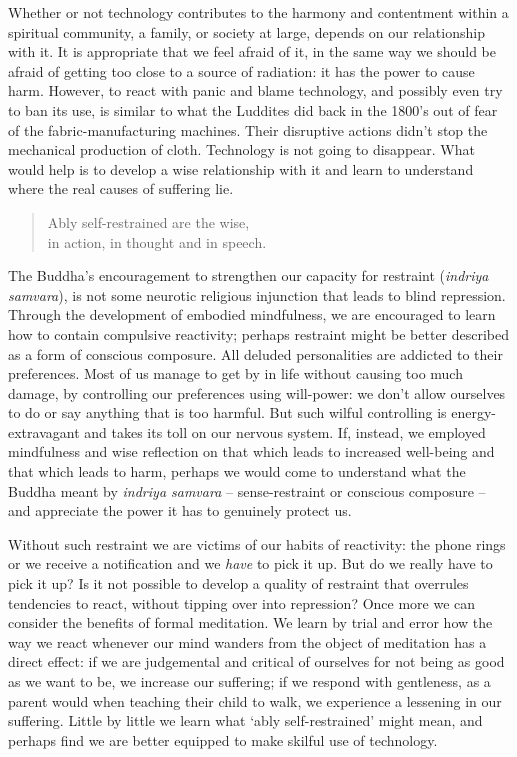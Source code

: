 Whether or not technology contributes to the harmony and contentment
within a spiritual community, a family, or society at large, depends on
our relationship with it. It is appropriate that we feel afraid of it,
in the same way we should be afraid of getting too close to a source of
radiation: it has the power to cause harm. However, to react with panic
and blame technology, and possibly even try to ban its use, is
similar to what the Luddites\cite{luddites}
did back in the 1800's out of fear of the fabric-manufacturing
machines. Their disruptive actions didn't stop the mechanical production
of cloth. Technology is not going to disappear. What would help is to
develop a wise relationship with it and learn to understand where the
real causes of suffering lie.

\begin{quote}
  Ably self-restrained are the wise,\\
  in action, in thought and in speech.

\end{quote}

The Buddha's encouragement to strengthen our capacity for restraint
(\emph{indriya samvara}), is not some neurotic religious injunction that
leads to blind repression. Through the development of embodied
mindfulness, we are encouraged to learn how to contain compulsive
reactivity; \mbox{perhaps} restraint might be better described as a form of
conscious composure. All deluded personalities are addicted to their
preferences. Most of us manage to get by in life without causing too
much damage, by controlling our preferences using will-power: we don't
allow ourselves to do or say anything that is too harmful. But such
wilful controlling is energy-extravagant and takes its toll on our
nervous system. If, instead, we employed mindfulness and wise reflection
on that which leads to increased well-being and that which leads to
harm, perhaps we would come to understand what the Buddha meant by
\emph{indriya samvara} -- sense-restraint or conscious composure -- and
appreciate the power it has to genuinely protect us.

Without such restraint we are victims of our habits of reactivity: the
phone rings or we receive a notification and we \emph{have} to pick it
up. But do we really have to pick it up? Is it not possible to develop a
quality of restraint that overrules tendencies to react, without tipping
over into repression? Once more we can consider the benefits of formal
meditation. We learn by trial and error how the way we react whenever
our mind wanders from the object of meditation has a direct effect: if
we are judgemental and critical of ourselves for not being as good as we
want to be, we increase our suffering; if we respond with gentleness, as
a parent would when teaching their child to walk, we experience a
lessening in our suffering. Little by little we learn what `ably
self-restrained' might mean, and perhaps find we are better equipped to make
skilful use of technology.

